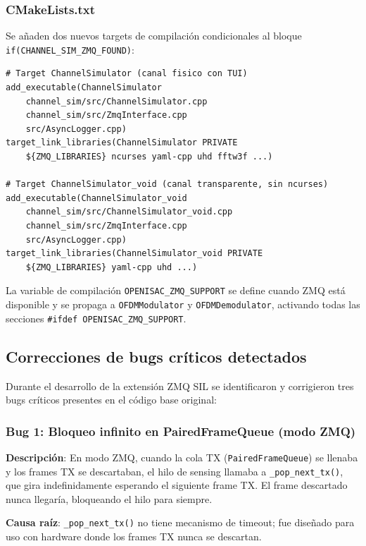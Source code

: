 \documentclass[11pt,a4paper]{article}
\begin{document}
\subsubsection{CMakeLists.txt}

Se añaden dos nuevos targets de compilación condicionales al bloque
\texttt{if(CHANNEL\_SIM\_}\allowbreak\texttt{ZMQ\_FOUND)}:

\begin{lstlisting}[style=bash,
  caption={Nuevos targets en CMakeLists.txt}]
# Target ChannelSimulator (canal fisico con TUI)
add_executable(ChannelSimulator
    channel_sim/src/ChannelSimulator.cpp
    channel_sim/src/ZmqInterface.cpp
    src/AsyncLogger.cpp)
target_link_libraries(ChannelSimulator PRIVATE
    ${ZMQ_LIBRARIES} ncurses yaml-cpp uhd fftw3f ...)

# Target ChannelSimulator_void (canal transparente, sin ncurses)
add_executable(ChannelSimulator_void
    channel_sim/src/ChannelSimulator_void.cpp
    channel_sim/src/ZmqInterface.cpp
    src/AsyncLogger.cpp)
target_link_libraries(ChannelSimulator_void PRIVATE
    ${ZMQ_LIBRARIES} yaml-cpp uhd ...)
\end{lstlisting}

La variable de compilación \texttt{OPENISAC\_ZMQ\_SUPPORT} se define cuando ZMQ está
disponible y se propaga a \texttt{OFDMModulator} y \texttt{OFDMDemodulator}, activando
todas las secciones \texttt{\#ifdef OPENISAC\_ZMQ\_SUPPORT}.

\subsection{Correcciones de bugs críticos detectados}
\label{sec:bugs}

Durante el desarrollo de la extensión ZMQ SIL se identificaron y corrigieron tres bugs
críticos presentes en el código base original:

\subsubsection{Bug 1: Bloqueo infinito en PairedFrameQueue (modo ZMQ)}

\textbf{Descripción}: En modo ZMQ, cuando la cola TX (\texttt{PairedFrameQueue})
se llenaba y los frames TX se descartaban, el hilo de sensing llamaba a
\texttt{\_pop\_next\_tx()}, que gira indefinidamente esperando el siguiente frame TX.
El frame descartado nunca llegaría, bloqueando el hilo para siempre.

\textbf{Causa raíz}: \texttt{\_pop\_next\_tx()} no tiene mecanismo de timeout; fue
diseñado para uso con hardware donde los frames TX nunca se descartan.
\end{document}
